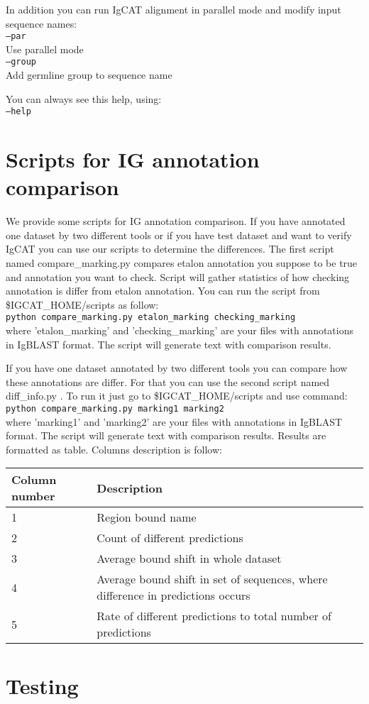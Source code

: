 \documentclass{scrartcl}
\newcommand{\shellcmd}[1]{\\\indent\indent\texttt{\footnotesize #1}\\}
\begin{document}
{{In addition you can run IgCAT alignment in parallel mode and modify input sequence names:
  \shellcmd{--par}
        Use parallel mode
  \shellcmd{--group}
        Add germline group to sequence name


You can always see this help, using:
  \shellcmd{--help}

\section{Scripts for IG annotation comparison}
\label{subsec:scripts}
We provide some scripts for IG annotation comparison.
If you have annotated one dataset by two different tools or
if you have test dataset and want to verify IgCAT
you can use our scripts to determine the differences.
The first script named compare\_marking.py compares
etalon annotation you suppose to be true
and annotation you want to check.
Script will gather statistics of how checking annotation
is differ from etalon annotation.
You can run the script from \$IGCAT\_HOME/scripts as follow:
\shellcmd{python compare\_marking.py etalon\_marking checking\_marking}
where 'etalon\_marking' and 'checking\_marking' are your files
with annotations in IgBLAST format.
The script will generate text with comparison results.

If you have one dataset annotated by two different tools
you can compare how these annotations are differ.
For that you can use the second script named diff\_info.py .
To run it just go to \$IGCAT\_HOME/scripts and use command:
\shellcmd{python compare\_marking.py marking1 marking2}
where 'marking1' and 'marking2' are your files
with annotations in IgBLAST format.
The script will generate text with comparison results.
Results are formatted as table.
Columns description is follow:\\
\begin{tabular}{l l}
\hline
Column number & Description \\
\hline
1 & Region bound name \\
2 & Count of different predictions \\
3 & Average bound shift in whole dataset \\
4 & Average bound shift in set of sequences, where difference in predictions occurs \\
5 & Rate of different predictions to total number of predictions \\
\hline
\end{tabular}


\section{Testing}

}}
\end{document}

